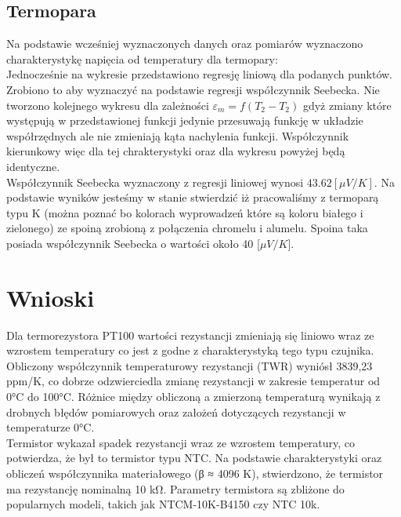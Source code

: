 \documentclass[11pt]{article}
\begin{document}
    \subsection{Termopara}
    \par Na podstawie wcześniej wyznaczonych danych oraz pomiarów wyznaczono charakterystykę napięcia od temperatury dla termopary:\\
    \noindent{}
    \indent Jednocześnie na wykresie przedstawiono regresję liniową dla podanych punktów. Zrobiono to aby wyznaczyć na podstawie regresji
    współczynnik Seebecka. Nie tworzono kolejnego wykresu dla zależności $\varepsilon_m=f(T_2-T_2)$ gdyż zmiany które występują w przedstawionej
    funkcji jedynie przesuwają funkcję w układzie współrzędnych ale nie zmieniają kąta nachylenia funkcji. Współczynnik kierunkowy więc dla tej chrakterystyki
    oraz dla wykresu powyżej będą identyczne.\\
    \indent Współczynnik Seebecka wyznaczony z regresji liniowej wynosi $43.62[\mu V/K]$. Na podstawie wyników jesteśmy w stanie stwierdzić
    iż pracowaliśmy z termoparą typu K (można poznać bo kolorach wyprowadzeń które są koloru białego i zielonego) ze spoiną zrobioną z
    połączenia chromelu i alumelu. Spoina taka posiada współczynnik Seebecka o wartości około 40 [$\mu V/K$].

    \section{Wnioski}
    \par Dla termorezystora PT100 wartości rezystancji zmieniają się liniowo wraz ze wzrostem temperatury
    co jest z godne z charakterystyką tego typu czujnika. Obliczony współczynnik temperaturowy rezystancji (TWR)
    wyniósł 3839,23 ppm/K, co dobrze odzwierciedla zmianę rezystancji w zakresie temperatur od 0°C do 100°C.
    Różnice między obliczoną a zmierzoną temperaturą wynikają z drobnych błędów pomiarowych oraz założeń dotyczących
    rezystancji w temperaturze 0°C.
    \\

    \indent Termistor wykazał spadek rezystancji wraz ze wzrostem temperatury, co potwierdza, że był to termistor typu NTC.
    Na podstawie charakterystyki oraz obliczeń współczynnika materiałowego (β ≈ 4096 K), stwierdzono, że termistor ma
    rezystancję nominalną 10 kΩ. Parametry termistora są zbliżone do popularnych modeli, takich jak NTCM-10K-B4150 czy NTC 10k.
    \\
\end{document}
